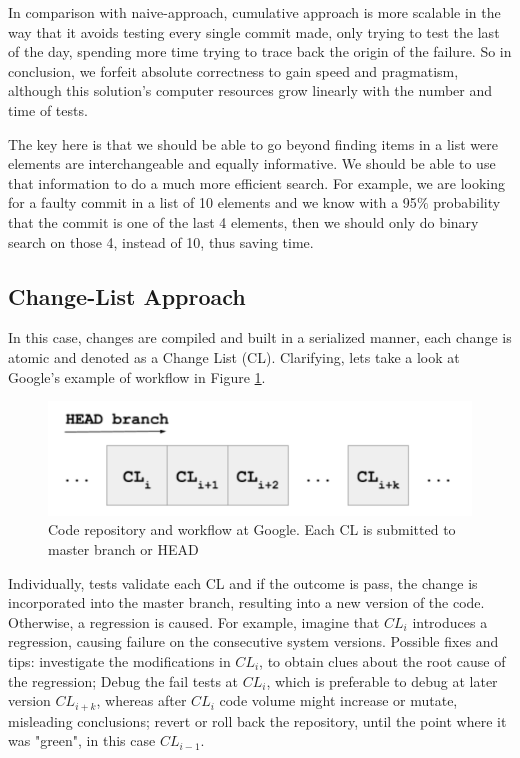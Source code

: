 In comparison with naive-approach, cumulative approach is more scalable in the way that it avoids testing every single commit made, only trying to test the last of the day, spending more time trying to trace back the origin of the failure. So in conclusion, we forfeit absolute correctness to gain speed and pragmatism, although this solution's computer resources grow linearly with the number and time of tests. 

The key here is that we should be able to go beyond finding items in a list were elements are interchangeable and equally informative. We should be able to use that information to do a much more efficient search. For example, we are looking for a faulty commit in a list of 10 elements and we know with a 95$\%$ probability that the commit is one of the last 4 elements, then we should only do binary search on those 4, instead of 10, thus saving time.


\subsection{Change-List Approach}

In this case, changes are compiled and built in a serialized manner, each change is atomic and denoted as a Change List (CL). Clarifying, lets take a look at Google's example of workflow in Figure \ref{googleWF}.

\begin{figure}[H]
	\centering
	\includegraphics[scale=0.5, width=0.6\linewidth]{figures/Google_WorkFlow.png}
	\caption{Code repository and workflow at Google. Each CL is submitted to master branch or HEAD \cite{Ziftci}}
	\label{googleWF}
\end{figure} 

Individually, tests validate each CL and if the outcome is pass, the change is incorporated into the master branch, resulting into a new version of the code. Otherwise, a regression is caused. For example, imagine that $CL_i$ introduces a regression, causing failure on the consecutive system versions. Possible fixes and tips: investigate the modifications in $CL_i$, to obtain clues about the root cause of the regression; Debug the fail tests at $CL_i$, which is preferable to debug at later version $CL_{i+k}$, whereas after $CL_i$ code volume might increase or mutate, misleading conclusions; revert or roll back the repository, until the point where it was "green", in this case $CL_{i-1}$.\cite{Ziftci}


